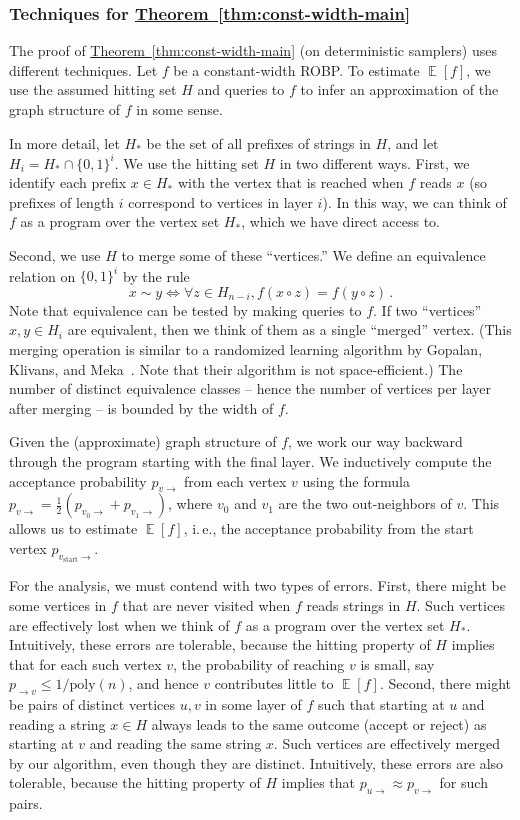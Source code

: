 \documentclass[11pt]{article}
\numberwithin{equation}{section}
\theoremstyle{definition}
\theoremstyle{plain}
\newcommand{\ie}{i.\,e.}
\newcommand{\expref}[2]{\hyperref[#2]{#1~\ref{#2}}}
\DeclareMathOperator*{\ExpVal}{\mathbb{E}}
\begin{document}
\subsubsection{Techniques for \expref{Theorem}{thm:const-width-main}} \label{sec:const-width-techniques}
The proof of \expref{Theorem}{thm:const-width-main} (on deterministic samplers) uses different techniques. Let $f$ be a constant-width ROBP. To estimate $\ExpVal[f]$, we use the assumed hitting set $H$ and queries to $f$ to infer an approximation of the graph structure of $f$ in some sense.

In more detail, let $H_*$ be the set of all prefixes of strings in $H$, and let $H_i = H_* \cap \{0, 1\}^i$. We use the hitting set $H$ in two different ways. First, we identify each prefix $x \in H_*$ with the vertex that is reached when $f$ reads $x$ (so prefixes of length $i$ correspond to vertices in layer $i$). In this way, we can think of $f$ as a program over the vertex set $H_*$, which we have direct access to.

Second, we use $H$ to merge some of these ``vertices.'' We define an equivalence relation on $\{0, 1\}^i$ by the rule
\[
x \sim y \iff \forall z \in H_{n - i}, f(x \circ z) = f(y \circ z)\,.
\]
Note that equivalence can be tested by making queries to $f$. If two ``vertices'' $x, y \in H_i$ are equivalent, then we think of them as a single ``merged'' vertex. (This merging operation is similar to a randomized learning algorithm by Gopalan, Klivans, and Meka~\cite{GKM12}. Note that their algorithm is not space-efficient.) The number of distinct equivalence classes -- hence the number of vertices per layer after merging -- is bounded by %
the width of $f$. %

Given the (approximate) graph structure of $f$, we work our way backward through the program starting with the final layer. We inductively compute the acceptance probability $p_{v \to}$ from each vertex $v$ using the formula $p_{v \to} = \frac{1}{2} (p_{v_0 \to} + p_{v_1 \to})$, where $v_0$ and $v_1$ are the two out-neighbors of $v$. This allows us to estimate $\ExpVal[f]$, \ie, the acceptance probability from the start vertex $p_{v_{\text{start}} \to}$.

For the analysis, we must contend with two types of errors. First, there might be some vertices in $f$ that are never visited when $f$ reads strings in $H$. Such vertices are effectively lost when we think of $f$ as a program over the vertex set $H_*$. Intuitively, these errors are tolerable, because the hitting property of $H$ implies that for each such vertex $v$, the probability of reaching $v$ is small, say $p_{\to v} \leq 1/\text{poly}(n)$, and hence $v$ contributes little to $\ExpVal[f]$. Second, there might be pairs of distinct vertices $u, v$ in some layer of $f$ such that starting at $u$ and reading a string $x \in H$ always leads to the same outcome (accept or reject) as starting at $v$ and reading the same string $x$. Such vertices are effectively merged by our algorithm, even though they are distinct. Intuitively, these errors are also tolerable, because the hitting property of $H$ implies that $p_{u \to} \approx p_{v \to}$ for such pairs.
\end{document}

